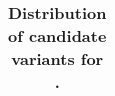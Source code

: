 %		


\begin{table}[H]
	\centering
	\caption{\bf Distribution of candidate variants for \datadm.}
	\begin{tabular}{c}
		
	\end{tabular}
	\label{tab:candann}
\end{table}

